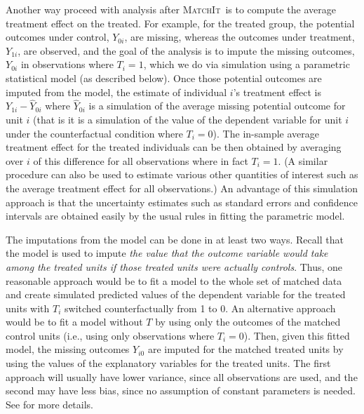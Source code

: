 \documentclass[oneside,letterpaper,titlepage]{article}
\newcommand{\MatchIt}{\textsc{MatchIt}}
\begin{document}
Another way proceed with analysis after \MatchIt\ is to compute the
average treatment effect on the treated.  For example, for the treated
group, the potential outcomes under control, $Y_{0i}$, are missing,
whereas the outcomes under treatment, $Y_{1i}$, are observed, and the
goal of the analysis is to impute the missing outcomes, $Y_{0i}$ in
observations where $T_i=1$, which we do via simulation using a
parametric statistical model (as described below).  Once those
potential outcomes are imputed from the model, the estimate of
individual $i$'s treatment effect is $Y_{1i}-\widehat{Y}_{0i}$ where
$\widehat{Y}_{0i}$ is a simulation of the average missing potential
outcome for unit $i$ (that is it is a simulation of the value of the
dependent variable for unit $i$ under the counterfactual condition
where $T_i=0$).  The in-sample average treatment effect for the
treated individuals can be then obtained by averaging over $i$ of this
difference for all observations where in fact $T_i=1$.  (A similar
procedure can also be used to estimate various other quantities of
interest such as the average treatment effect for all observations.)
An advantage of this simulation approach is that the uncertainty
estimates such as standard errors and confidence intervals are
obtained easily by the usual rules in fitting the parametric model.

The imputations from the model can be done in at least two ways.
Recall that the model is used to impute \emph{the value that the
  outcome variable would take among the treated units if those treated
  units were actually controls}.  Thus, one reasonable approach would
be to fit a model to the whole set of matched data and create
simulated predicted values of the dependent variable for the treated
units with $T_i$ switched counterfactually from 1 to 0.  An
alternative approach would be to fit a model without $T$ by using only
the outcomes of the matched control units (i.e., using only
observations where $T_i=0$).  Then, given this fitted model, the
missing outcomes $Y_{i0}$ are imputed for the matched treated units by
using the values of the explanatory variables for the treated units.
The first approach will usually have lower variance, since all
observations are used, and the second may have less bias, since no
assumption of constant parameters is needed.  See \citep{HoImaKin05}
for more details.

\end{document}
